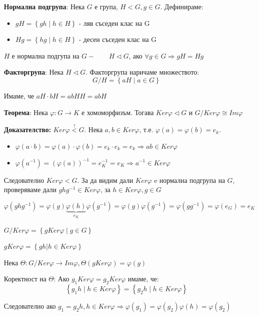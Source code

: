 \documentclass{article}
\renewcommand{\\}{\newline}
\newcommand{\sep}{\;|\;}
\newcommand{\doc}{\textbf{Доказателство: }}
\begin{document}
\textbf{Нормална подгрупа}: Нека \(G\) е група, \(H < G, g \in G\). Дефинираме: \begin{itemize}
    \item \(gH = \left\{gh \sep h \in H\right\}\) - ляв съседен клас на G 
    \item \(Hg = \left\{hg \sep h \in H\right\}\) - десен съседен клас на G 
\end{itemize}  

\(H\) е нормална подгупа на \(G - \qquad H \lhd G\), ако \(\forall g \in G \Rightarrow gH = Hg\)   

\textbf{Факторгрупа}: Нека \(H \lhd G\). Факторгрупа наричаме множеството: \[
  G / H = \left\{aH \sep a \in G\right\}
\] 

Имаме, че \(aH\cdot bH = abHH = abH\)  

\textbf{Теорема}: Нека \(\varphi: G \to K\) е хомоморфизъм. Тогава \(Ker \varphi \lhd G\) и  \(G / Ker \varphi \cong Im \varphi\) 

\doc \(Ker \varphi \overset{?}{<} G\). Нека \(a, b \in Ker \varphi\), т.е. \(\varphi(a) = \varphi(b) = e_k\).
\begin{itemize}
    \item \(\varphi(a \cdot b) = \varphi(a) \cdot \varphi(b) = e_k \cdot e_k = e_k \Rightarrow ab \in Ker \varphi\)
    \item \(\varphi(a^{-1}) = (\varphi(a))^{-1} = e^{-1}_{K} = e_{K} \Rightarrow a^{-1} \in Ker \varphi\)  
\end{itemize}

Следователно \(Ker \varphi < G\). За да видим дали \(Ker \varphi\) e нормална подгрупа на \(G\), проверяваме дали \(ghg^{-1} \in Ker \varphi\), за \(h \in Ker \varphi, g \in G\) 

\[\varphi(ghg^{-1}) = \varphi(g)\underbrace{\varphi(h)}_{e_K}\varphi(g^{-1}) = \varphi(g)\varphi(g^{-1}) = \varphi(gg^{-1}) = \varphi(e_G) = e_{K} \] 

\(G/Ker \varphi = \left\{g Ker \varphi \sep g \in G\right\}\) 

\(gKer \varphi = \left\{gh | h \in Ker \varphi\right\}\) 

Нека \(\Theta: G/Ker \varphi \to Im \varphi, \Theta(gKer \varphi) = \varphi(g)\)  

Коректност на \(\Theta\): Ако \(g_1Ker \varphi = g_2 Ker \varphi\) имаме, че: \[
  \left\{g_{1}h \sep h \in Ker \varphi\right\} = \left\{g_2h \sep h \in Ker \varphi\right\}
\]   

Следователно ако \(g_1 = g_2h, h \in Ker \varphi \Rightarrow \varphi(g_1) = \varphi(g_2)\varphi(h) = \varphi(g_2)\)  
\end{document}
